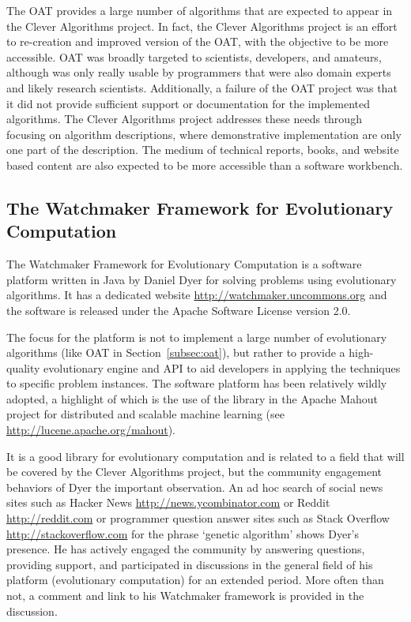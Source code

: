 \documentclass[a4paper, 11pt]{article}
\begin{document}
The OAT provides a large number of algorithms that are expected to appear in the Clever Algorithms project. In fact, the Clever Algorithms project is an effort to re-creation and improved version of the OAT, with the objective to be more accessible. OAT was broadly targeted to scientists, developers, and amateurs, although was only really usable by programmers that were also domain experts and likely research scientists. Additionally, a failure of the OAT project was that it did not provide sufficient support or documentation for the implemented algorithms. The Clever Algorithms project addresses these needs through focusing on algorithm descriptions, where demonstrative implementation are only one part of the description. The medium of technical reports, books, and website based content are also expected to be more accessible than a software workbench.

% 
% 
\subsection{The Watchmaker Framework for Evolutionary Computation}
The Watchmaker Framework for Evolutionary Computation is a software platform written in Java by Daniel Dyer for solving problems using evolutionary algorithms. It has a dedicated website \url{http://watchmaker.uncommons.org} and the software is released under the Apache Software License version 2.0. 

The focus for the platform is not to implement a large number of evolutionary algorithms (like OAT in Section~\ref{subsec:oat}), but rather to provide a high-quality evolutionary engine and API to aid developers in applying the techniques to specific problem instances. The software platform has been relatively wildly adopted, a highlight of which is the use of the library in the Apache Mahout project for distributed and scalable machine learning (see \url{http://lucene.apache.org/mahout}). 

It is a good library for evolutionary computation and is related to a field that will be covered by the Clever Algorithms project, but the community engagement behaviors of Dyer the important observation. An ad hoc search of social news sites such as Hacker News \url{http://news.ycombinator.com} or Reddit \url{http://reddit.com} or programmer question answer sites such as Stack Overflow \url{http://stackoverflow.com} for the phrase `genetic algorithm' shows Dyer's presence. He has actively engaged the community by answering questions, providing support, and participated in discussions in the general field of his platform (evolutionary computation) for an extended period. More often than not, a comment and link to his Watchmaker framework is provided in the discussion. 
\end{document}
